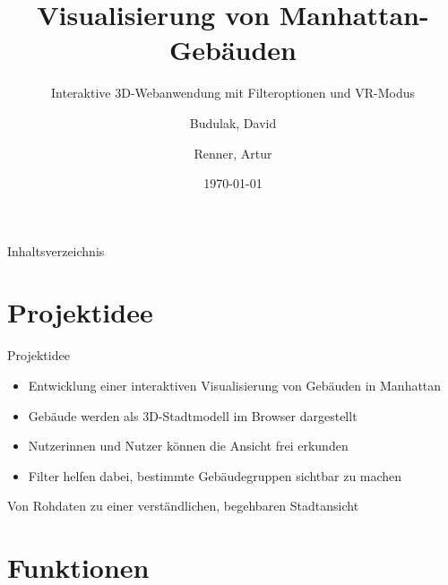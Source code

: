\documentclass[
amberg, %
toc=fancy, %
footlinebox, %
nometaot %
]{OTHAWbeamer}
\title[Manhattan Buildings]{Visualisierung von Manhattan-Gebäuden}
\subtitle{Interaktive 3D-Webanwendung mit Filteroptionen und VR-Modus}
\author{Budulak, David \and Renner, Artur}
\institute{OTH Amberg-Weiden}
\date{\today}
\begin{document}
    \maketitle

    \begin{frame}{Inhaltsverzeichnis}
        \tableofcontents
    \end{frame}



    \section{Projektidee}

    \begin{frame}{Projektidee}
        \begin{itemize}
            \item Entwicklung einer interaktiven Visualisierung von Gebäuden in Manhattan
            \item Gebäude werden als 3D-Stadtmodell im Browser dargestellt
            \item Nutzerinnen und Nutzer können die Ansicht frei erkunden
            \item Filter helfen dabei, bestimmte Gebäudegruppen sichtbar zu machen
        \end{itemize}

        \vspace{0.5cm}

        \begin{center}
            \Large
            Von Rohdaten zu einer verständlichen, begehbaren Stadtansicht
        \end{center}
    \end{frame}

    \section{Funktionen}
\end{document}
